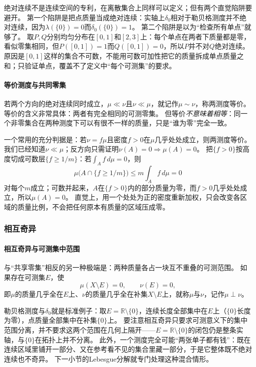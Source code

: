绝对连续不是连续空间的专利，在离散集合上同样可以定义；但有两个直觉陷阱要避开。
第一个陷阱是把点质量当成绝对连续：实轴上$\delta_0$相对于勒贝格测度并不绝对连续，因为$\lambda(\{0\})=0$而$\delta_0(\{0\})=1$。
第二个陷阱是以为“检查所有单点”就够了。
取$P,Q$分别均匀分布在$[0,1]$和$[2,3]$上：每个单点在两者下质量都是零，看似零集相同，但$P([0,1])=1$而$Q([0,1])=0$，所以$P$并不对$Q$绝对连续。
原因是$[0,1]$这样的集合不可数，不能用可数可加性把它的质量拆成单点质量之和；只验证单点，覆盖不了定义中“每个可测集”的要求。

\paragraph{等价测度与共同零集}

若两个方向的绝对连续同时成立，$\mu\ll\nu$且$\nu\ll\mu$，就记作$\mu\sim\nu$，称两测度等价。
等价的含义非常具体：两者有完全相同的可测零集。
但等价\emph{不意味着相等}：同一个非零集合在两种测度下可以有很不一样的质量，只是“谁为零”完全一致。

一个常用的充分判据是：若$\nu=f\mu$且密度$f>0$在$\mu$几乎处处成立，则两测度等价。
我们已经知道$\nu\ll\mu$；反方向只需证明$\nu(A)=0\Rightarrow\mu(A)=0$。
把$\{f>0\}$按高度切成可数层$\{f\geq1/m\}$：若$\int_Af\,d\mu=0$，则
\[
 \mu\bigl(A\cap\{f\geq1/m\}\bigr)
 \leq m\int_Af\,d\mu=0
\]
对每个$m$成立；可数并起来，$A$在$\{f>0\}$内的部分质量为零，而$f>0$几乎处处成立，所以$\mu(A)=0$。
直觉上，用一个处处为正的密度重新加权，只会改变各区域的质量比例，不会把任何原本有质量的区域压成零。

\subsubsection{相互奇异}

\paragraph{相互奇异与可测集中范围}

与“共享零集”相反的另一种极端是：两种质量各占一块互不重叠的可测范围。
如果存在可测集$E$，使
\[
 \mu(X\setminus E)=0,\qquad \nu(E)=0,
\]
即$\mu$的质量几乎全在$E$上、$\nu$的质量几乎全在补集$X\setminus E$上，就称$\mu$与$\nu$，记作$\mu\perp\nu$。

勒贝格测度与$\delta_0$就是标准例子：取$E=\mathbb R\setminus\{0\}$，连续长度全部集中在$E$上（$\{0\}$长度为零），点质量全部集中在补集$\{0\}$上。
要注意相互奇异只要求可测意义下的集中范围分离，并不要求这两个范围在几何上隔开——$E=\mathbb R\setminus\{0\}$的闭包仍是整条实轴，与$\{0\}$在拓扑上并不分离。
此外，一个测度完全可能“两张单子都有钱”：既在连续区域里铺开一部分、又在参考看不见的集合里藏一部分，于是它整体既不绝对连续也不奇异。
下一小节的Lebesgue分解就专门处理这种混合情形。

